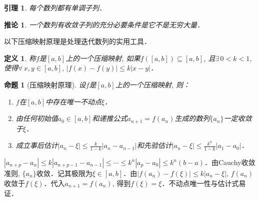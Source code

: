 \documentclass[11pt,a4paper]{ctexart}
\makeatletter
\theoremstyle{thmseries} %
\newtheorem{cor}{推论}[section]
\newtheorem{prop}{命题}[section]
\newtheorem{lem}{引理}[section]
\theoremstyle{exerseries}
\newtheorem{defn}{定义}[section]
\newtheorem{exer}{习题}[section]
\newtheorem*{rem}{注}
\renewenvironment{proof}[1][\proofname]{\par
  \pushQED{\qed}%
  \normalfont \topsep6\p@\@plus6\p@\relax
  \trivlist
  \item[\hskip\labelsep
        \itshape
    #1\@addpunct{}]\ignorespaces
}{%
  \popQED\endtrivlist\@endpefalse
}
\newenvironment{pf}{\begin{proof}[\bfseries\upshape 证\quad]}{\end{proof}}
\newcommand{\bra}[1]{\mathopen{}\left(#1\right)}
\makeatother
\begin{document}

\begin{lem}
	每个数列都有单调子列．
\end{lem}

\begin{cor}
	一个数列有收敛子列的充分必要条件是它不是无穷大量．
\end{cor}

以下压缩映射原理是处理迭代数列的实用工具．
\begin{defn}
	称$f$是$[a,b]$上的一个压缩映射, 如果$f\bra{[a,b]}\subseteq[a,b]$, 且$\exists\,0<k<1$, 使得$\forall\,x,y\in[a,b],\,|f(x)-f(y)|\leq k|x-y|$．
\end{defn}

\begin{prop}[压缩映射原理]
	设$f$是$[a,b]$上的一个压缩映射, 则：
	\begin{enumerate}
		\item $f$在$[a,b]$中存在唯一不动点$\xi$．
		\item 由任何初始值$a_0\in[a,b]$和递推公式$a_{n+1}=f(a_n)$生成的数列$\{a_n\}$一定收敛于$\xi$．
		\item 成立事后估计$|a_n-\xi|\leq\frac{k}{1-k}|a_n-a_{n-1}|$和先验估计$|a_n-\xi|\leq\frac{k^n}{1-k}|a_1-a_0|$．
	\end{enumerate}
\end{prop}
\begin{pf}
	$|a_{n+p}-a_n|\leq k|a_{n+p-1}-a_{n-1}|\leq\cdots\leq k^n|a_p-a_0|\leq k^n(b-a)$．由Cauchy收敛准则, $\{a_n\}$收敛．记其极限为$\xi\in[a,b]$．由$|f(a_n)-f(\xi)|\leq k|a_n-\xi|,\,f(a_n)$收敛于$f(\xi)$．代入$a_{n+1}=f(a_n)$, 得到$f(\xi)=\xi$．不动点唯一性与估计式易证．
\end{pf}

\end{document}
